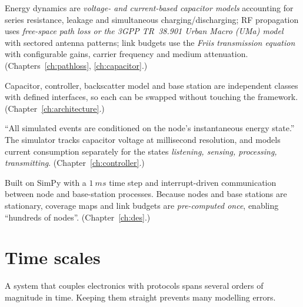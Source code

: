\begin{description}[leftmargin=0.5cm,font=\sffamily\bfseries\color{ablue}]
 \item[Physically grounded modelling.] Energy dynamics are \emph{voltage- and
   current-based capacitor models} accounting for series resistance, leakage
   and simultaneous charging/discharging; RF propagation uses \emph{free-space
   path loss or the 3GPP TR~38.901 Urban Macro (UMa) model} with sectored
   antenna patterns; link budgets use the \emph{Friis transmission equation}
   with configurable gains, carrier frequency and medium attenuation.
   (Chapters~\ref{ch:pathloss}, \ref{ch:capacitor}.)
 \item[Modularity.] Capacitor, controller, backscatter model and base station are
   independent classes with defined interfaces, so each can be swapped without
   touching the framework. (Chapter~\ref{ch:architecture}.)
 \item[Energy awareness.] ``All simulated events are conditioned on the node's
   instantaneous energy state.'' The simulator tracks capacitor voltage at
   millisecond resolution, and models current consumption separately for the
   states \emph{listening, sensing, processing, transmitting}.
   (Chapter~\ref{ch:controller}.)
 \item[Scalability.] Built on SimPy with a $\SI{1}{ms}$ time step and
   interrupt-driven communication between node and base-station processes.
   Because nodes and base stations are stationary, coverage maps and link
   budgets are \emph{pre-computed once}, enabling ``hundreds of nodes''.
   (Chapter~\ref{ch:des}.)
\end{description}

\section{Time scales}

A system that couples electronics with protocols spans several orders of
magnitude in time. Keeping them straight prevents many modelling errors.

